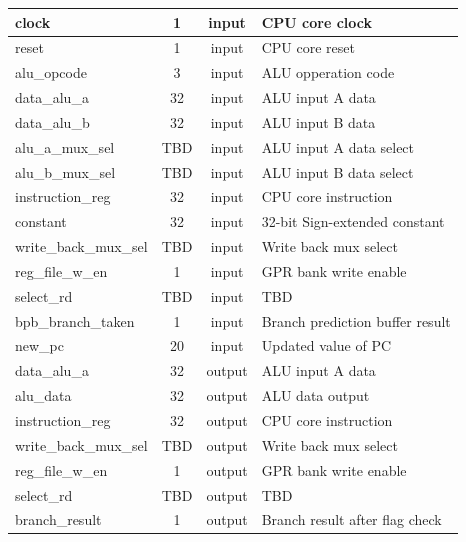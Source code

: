 \documentclass{article}
\begin{document}
\begin{center}
\begin{longtable}[pos]{| l | c | c | m{7cm} |}
        clock               & 1   & input   & CPU core clock    \\ \hline
        reset               & 1   & input   & CPU core reset    \\ \hline
        alu\_opcode         & 3  & input  & ALU opperation code  \\ \hline
        data\_alu\_a        & 32 & input  & ALU input A data  \\ \hline
        data\_alu\_b        & 32 & input  & ALU input B data  \\ \hline
        alu\_a\_mux\_sel & TBD& input  & ALU input A data select  \\ \hline
        alu\_b\_mux\_sel & TBD& input  & ALU input B data select \\ \hline
        instruction\_reg    & 32 & input  & CPU core instruction  \\ \hline        
        constant            & 32 & input  & 32-bit Sign-extended constant  \\ \hline
        write\_back\_mux\_sel & TBD & input & Write back mux select \\ \hline  
        reg\_file\_w\_en    & 1   & input  & GPR bank write enable \\ \hline 
        select\_rd          & TBD & input  & TBD  \\ \hline
        bpb\_branch\_taken  & 1   & input   & Branch prediction buffer result \\ \hline
        new\_pc             & 20 & input  & Updated value of PC  \\ \hline    
        data\_alu\_a        & 32 & output  & ALU input A data  \\ \hline         
        alu\_data           & 32  & output  & ALU data output \\ \hline
        instruction\_reg    & 32 & output  & CPU core instruction  \\ \hline  
        write\_back\_mux\_sel & TBD & output & Write back mux select \\ \hline  
        reg\_file\_w\_en    & 1   & output  & GPR bank write enable \\ \hline 
        select\_rd          & TBD & output  & TBD  \\ \hline 
        branch\_result      & 1   & output  & Branch result after flag check \\

      \end{longtable}
    \end{center} 
     
\end{document}
